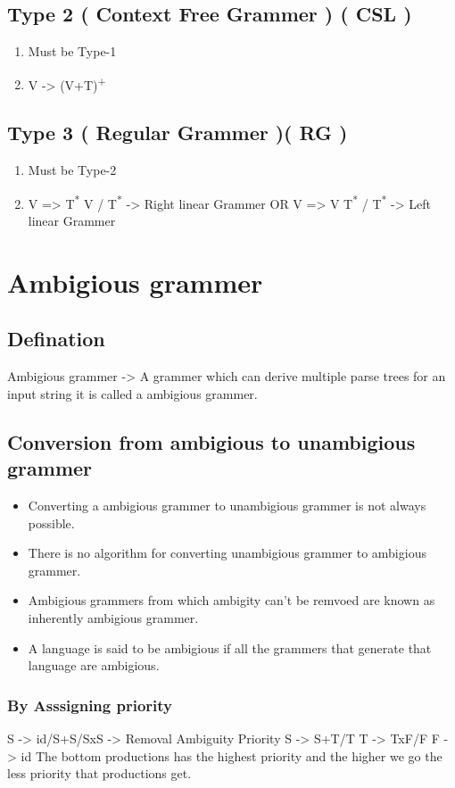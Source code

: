 \documentclass[11pt]{article}
\begin{document}
\subsection{Type 2 ( Context Free Grammer ) ( CSL )}
\label{sec:org40aab5b}
\begin{enumerate}
\item Must be Type-1
\item V -> (V+T)\textsuperscript{+}
\end{enumerate}
\subsection{Type 3 ( Regular Grammer )( RG )}
\label{sec:orge6d5e0f}
\begin{enumerate}
\item Must be Type-2
\item V => T\textsuperscript{*}  \texttimes{} V / T\textsuperscript{*} -> Right linear Grammer
OR
V => V \texttimes{} T\textsuperscript{*} / T\textsuperscript{*} -> Left linear Grammer
\end{enumerate}
\section{Ambigious grammer}
\label{sec:org1e94aee}
\subsection{Defination}
\label{sec:org1ca8d95}
Ambigious grammer -> A grammer which can derive multiple parse trees for an input string it is called a ambigious grammer.
\subsection{Conversion from ambigious to unambigious grammer}
\label{sec:org6b7c8aa}
\begin{itemize}
\item Converting a ambigious grammer to unambigious grammer is not always possible.
\item There is no algorithm for converting unambigious grammer to ambigious grammer.
\item Ambigious grammers from which ambigity can't be remvoed are known as inherently ambigious grammer.
\item A language is said to be ambigious if all the grammers that generate that language are ambigious.
\end{itemize}
\subsubsection{By Asssigning priority}
\label{sec:orgce4ba3f}
S -> id/S+S/SxS -> Removal Ambiguity
Priority S -> S+T/T
         T -> TxF/F
         F -> id
The bottom productions has the highest priority and the higher we go the less priority that productions get.
\end{document}
